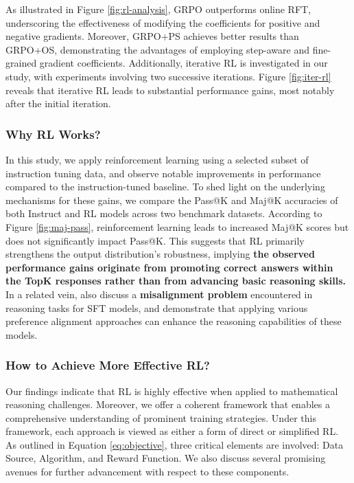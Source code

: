 \begin{itemize}[topsep=0pt]
\begin{itemize}[topsep=0pt]
As illustrated in Figure \ref{fig:rl-analysis}, GRPO outperforms online RFT, underscoring the effectiveness of modifying the coefficients for positive and negative gradients. Moreover, GRPO+PS achieves better results than GRPO+OS, demonstrating the advantages of employing step-aware and fine-grained gradient coefficients. Additionally, iterative RL is investigated in our study, with experiments involving two successive iterations. Figure \ref{fig:iter-rl} reveals that iterative RL leads to substantial performance gains, most notably after the initial iteration.

\subsubsection{Why RL Works?} In this study, we apply reinforcement learning using a selected subset of instruction tuning data, and observe notable improvements in performance compared to the instruction-tuned baseline. To shed light on the underlying mechanisms for these gains, we compare the Pass@K and Maj@K accuracies of both Instruct and RL models across two benchmark datasets. According to Figure \ref{fig:maj-pass}, reinforcement learning leads to increased Maj@K scores but does not significantly impact Pass@K. This suggests that RL primarily strengthens the output distribution’s robustness, implying \textbf{the observed performance gains originate from promoting correct answers within the TopK responses rather than from advancing basic reasoning skills.} In a related vein, \citep{wang2023making} also discuss a \textbf{misalignment problem} encountered in reasoning tasks for SFT models, and demonstrate that applying various preference alignment approaches \citep{yuan2023rrhf,song2023preference,wang2023making} can enhance the reasoning capabilities of these models.

\subsubsection{How to Achieve More Effective RL?}
\label{sec:effec_rl}
Our findings indicate that RL is highly effective when applied to mathematical reasoning challenges. Moreover, we offer a coherent framework that enables a comprehensive understanding of prominent training strategies. Under this framework, each approach is viewed as either a form of direct or simplified RL. As outlined in Equation \ref{eq:objective}, three critical elements are involved: Data Source, Algorithm, and Reward Function. We also discuss several promising avenues for further advancement with respect to these components.


\end{itemize}
\end{itemize}
